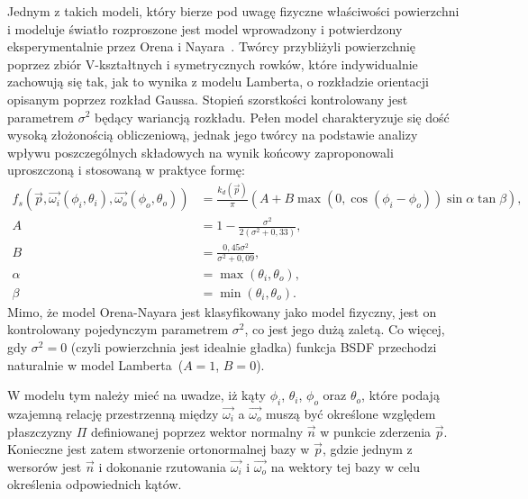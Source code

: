 Jednym z takich modeli, który bierze pod uwagę fizyczne właściwości powierzchni i modeluje światło rozproszone jest model wprowadzony i potwierdzony eksperymentalnie przez Orena i Nayara~\cite{Oren94generalizationof}\cite{Nayar95visualappearance}. Twórcy przybliżyli powierzchnię poprzez zbiór V-kształtnych i symetrycznych rowków, które indywidualnie zachowują się tak, jak to wynika z modelu Lamberta, o rozkładzie orientacji opisanym poprzez rozkład Gaussa. Stopień szorstkości kontrolowany jest parametrem $\sigma^2$ będący wariancją rozkładu. Pełen model charakteryzuje się dość wysoką złożonością obliczeniową, jednak jego twórcy na podstawie analizy wpływu poszczególnych składowych na wynik końcowy zaproponowali uproszczoną i stosowaną w praktyce formę:
\begin{align}
\label{ch1:eq:ON_BRDF}
f_s(\vec{p}, \vec{\omega_i}(\phi_i, \theta_i), \vec{\omega_o}(\phi_o, \theta_o)) &= \frac{k_d(\vec{p})}{\pi}(A + B\max(0, \cos(\phi_i - \phi_o))\sin\alpha\tan\beta),\\
A &= 1 - \frac{\sigma^2}{2(\sigma^2 + 0,33)},\\
B &= \frac{0,45\sigma^2}{\sigma^2 + 0,09},\\
\alpha &= \max(\theta_i, \theta_o),\\
\beta &= \min(\theta_i, \theta_o).
\end{align}
Mimo, że model Orena-Nayara jest klasyfikowany jako model fizyczny, jest on kontrolowany pojedynczym parametrem $\sigma^2$, co jest jego dużą zaletą. Co więcej, gdy $\sigma^2 = 0$ (czyli powierzchnia jest idealnie gładka) funkcja BSDF przechodzi naturalnie w model Lamberta~($A=1$, $B=0$). 

W modelu tym należy mieć na uwadze, iż kąty $\phi_i$, $\theta_i$, $\phi_o$ oraz $\theta_o$, które podają wzajemną relację przestrzenną między $\vec{\omega_i}$ a $\vec{\omega_o}$ muszą być określone względem płaszczyzny $\Pi$ definiowanej poprzez wektor normalny $\vec{n}$ w punkcie zderzenia $\vec{p}$. Konieczne jest zatem stworzenie ortonormalnej bazy w $\vec{p}$, gdzie jednym z wersorów jest $\vec{n}$ i dokonanie rzutowania $\vec{\omega_i}$ i $\vec{\omega_o}$ na wektory tej bazy w celu określenia odpowiednich kątów.

